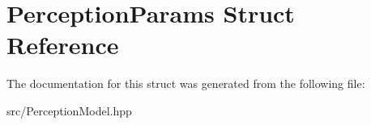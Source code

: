 \hypertarget{structPerceptionParams}{}\section{Perception\+Params Struct Reference}
\label{structPerceptionParams}


The documentation for this struct was generated from the following file\+:\begin{DoxyCompactItemize}
\item 
src/Perception\+Model.\+hpp\end{DoxyCompactItemize}

